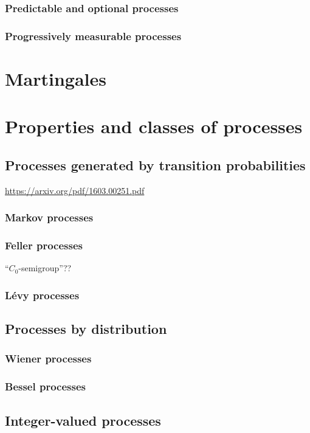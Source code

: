 \subsubsection{Predictable and optional processes}

\subsubsection{Progressively measurable processes}

\section{Martingales}

\section{Properties and classes of processes}
\subsection{Processes generated by transition probabilities}
\url{https://arxiv.org/pdf/1603.00251.pdf}
\subsubsection{Markov processes}
\subsubsection{Feller processes}
``$C_0$-semigroup''??
\subsubsection{Lévy processes}

\subsection{Processes by distribution}
\subsubsection{Wiener processes}
\subsubsection{Bessel processes}

\subsection{Integer-valued processes}
